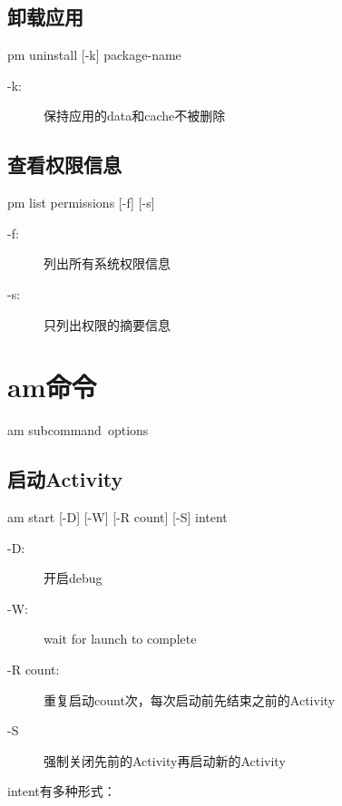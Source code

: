 ﻿\documentclass{article}
\begin{document}
  \subsection[卸载应用]{卸载应用}
  pm uninstall [-k] \lt package-name\gt
  
  \begin{description}
    \item[-k:] 保持应用的data和cache不被删除
  \end{description}
  
  \subsection[查看权限信息]{查看权限信息}
  pm list permissions [-f] [-s]
  
  \begin{description}
    \item[-f:] 列出所有系统权限信息
    \item[-s:] 只列出权限的摘要信息
  \end{description}
  
  
  \section[am - Application Manager]{am命令}
  am \lt subcommand\gt\ \lt options\gt
  
  \subsection[启动Activity]{启动Activity}
  am start [-D] [-W] [-R \lt count\gt] [-S] \lt intent\gt
  
  \begin{description}
    \item[-D:] 开启debug
    \item[-W:] wait for launch to complete
    \item[-R \lt count\gt:] 重复启动count次，每次启动前先结束之前的Activity
    \item[-S] 强制关闭先前的Activity再启动新的Activity
  \end{description}
  
  \lt intent\gt 有多种形式：
  
\end{document}
